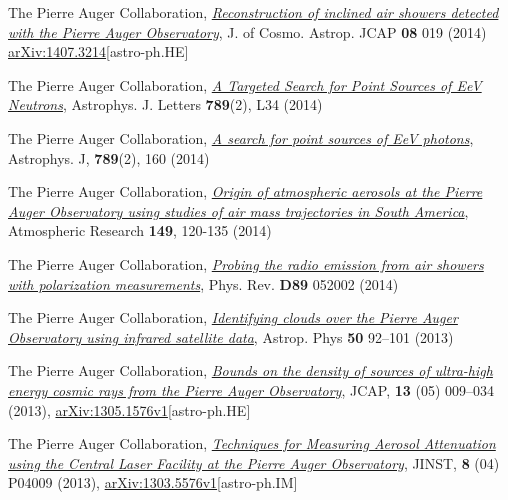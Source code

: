 \begin{etaremune}
\item {}The Pierre Auger Collaboration, \href{http://dx.doi.org/10.1088/1475-7516/2014/08/019}{\emph{Reconstruction of inclined air showers detected with the Pierre Auger Observatory}}, J. of Cosmo. Astrop. JCAP {\bf{08}} 019 (2014) \href{http://arxiv.org/abs/1407.3214}{arXiv:1407.3214}[astro-ph.HE]
  
\item {}The Pierre Auger Collaboration, \href{http://iopscience.iop.org/2041-8205/789/2/L34}{\emph{A Targeted Search for Point Sources of EeV Neutrons}}, Astrophys. J. Letters {\bf{789}}(2), L34 (2014)

\item {}The Pierre Auger Collaboration, \href{http://iopscience.iop.org/0004-637X/789/2/160}{\emph{A search for point sources of EeV photons}}, Astrophys. J, {\bf{789}}(2), 160 (2014)

\item {}The Pierre Auger Collaboration, \href{http://dx.doi.org/10.1016/j.atmosres.2014.05.021}{\emph{Origin of atmospheric aerosols at the Pierre Auger Observatory using studies of air mass trajectories in South America}}, Atmospheric Research {\bf{149}}, 120-135 (2014)

\item {}The Pierre Auger Collaboration, \href{http://dx.doi.org/10.1103/PhysRevD.89.052002}{\emph{Probing the radio emission from air showers with polarization measurements}}, Phys. Rev. {\bf{D89}} 052002 (2014)

\item {}The Pierre Auger Collaboration, \href{http://dx.doi.org/10.1016/j.astropartphys.2013.09.004}{\emph{Identifying clouds over the Pierre Auger Observatory using infrared satellite data}}, Astrop. Phys {\bf{50}} 92--101 (2013)

\item {}The Pierre Auger Collaboration, \href{http://dx.doi.org/10.1088/1475-7516/2013/05/009}{\emph{Bounds on the density of sources of ultra-high energy cosmic rays from the Pierre Auger Observatory}}, JCAP, {\bf{13}} (05) 009--034 (2013), \href{http://arxiv.org/abs/1305.1576}{arXiv:1305.1576v1}[astro-ph.HE]

\item {}The Pierre Auger Collaboration, \href{http://dx.doi.org/10.1088/1748-0221/8/04/P04009}{\emph{Techniques for Measuring Aerosol Attenuation using the Central Laser Facility at the Pierre Auger Observatory}}, JINST, {\bf{8}} (04) P04009 (2013), \href{http://arxiv.org/abs/1303.5576}{arXiv:1303.5576v1}[astro-ph.IM]


\end{etaremune}
